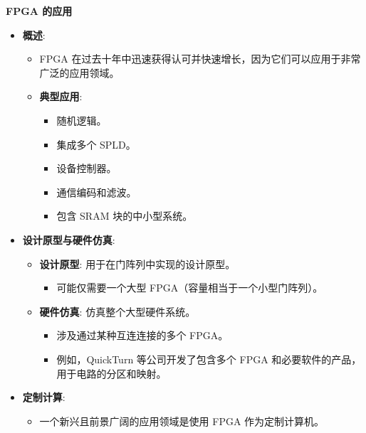 \begin{frame}[allowframebreaks]{\textbf{FPGA 的应用}}
\begin{itemize}
\tightlist
\item
    \textbf{概述}:

    \begin{itemize}
    \tightlist
    \item
    FPGA
    在过去十年中迅速获得认可并快速增长，因为它们可以应用于非常广泛的应用领域。
    \item
    \textbf{典型应用}:

    \begin{itemize}
    \tightlist
    \item
        随机逻辑。
    \item
        集成多个 SPLD。
    \item
        设备控制器。
    \item
        通信编码和滤波。
    \item
        包含 SRAM 块的中小型系统。
    \end{itemize}
    \end{itemize}
\item
    \textbf{设计原型与硬件仿真}:

    \begin{itemize}
    \tightlist
    \item
    \textbf{设计原型}: 用于在门阵列中实现的设计原型。

    \begin{itemize}
    \tightlist
    \item
        可能仅需要一个大型 FPGA（容量相当于一个小型门阵列）。
    \end{itemize}
    \item
    \textbf{硬件仿真}: 仿真整个大型硬件系统。

    \begin{itemize}
    \tightlist
    \item
        涉及通过某种互连连接的多个 FPGA。
    \item
        例如，QuickTurn 等公司开发了包含多个 FPGA
        和必要软件的产品，用于电路的分区和映射。
    \end{itemize}
    \end{itemize}

\item
    \textbf{定制计算}:

    \begin{itemize}
    \tightlist
    \item
    一个新兴且前景广阔的应用领域是使用 FPGA 作为定制计算机。


\end{itemize}
\end{itemize}
\end{frame}
